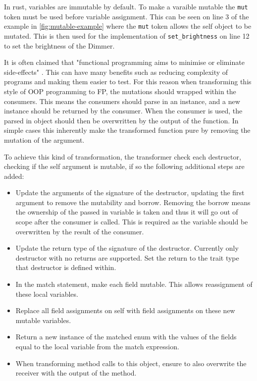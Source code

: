 \documentclass[ oneside,%
                    author={James Elgar},
                    degree={MEng},
                     title={Bidirectional transformer between functional and \\ object-oriented programming in Rust},
                  subtitle={}]{dissertation}
\newcommand{\rust}[1]{\texttt{#1}}
\begin{document}
In rust, variables are immutable by default. To make a varaible mutable the \rust{mut} token must be used before variable assignment. This can be seen on line 3 of the example in \autoref{fig:mutable-example} where the \verb|mut| token allows the self object to be mutated. This is then used for the implementation of \rust{set_brightness} on line 12 to set the brightness of the Dimmer. 

It is often claimed that "functional programming aims to minimise or eliminate side-effects" \cite{fp-uok}. This can have many benefits such as reducing complexity of programs and making them easier to test. For this reason when transforming this style of OOP programming to FP, the mutations should wrapped within the consumers. This means the consumers should parse in an instance, and a new instance should be returned by the consumer. When the consumer is used, the parsed in object should then be overwritten by the output of the function.  In simple cases this inherently make the transformed function pure by removing the mutation of the argument.

To achieve this kind of transformation, the transformer check each destructor, checking if the self argument is mutable, if so the following additional steps are added:

\begin{itemize}
    \item Update the arguments of the signature of the destructor, updating the first argument to remove the mutability and borrow. Removing the borrow means the ownership of the passed in variable is taken and thus it will go out of scope after the consumer is called. This is required  as the variable should be overwritten by the result of the consumer. 
    \item Update the return type of the signature of the destructor. Currently only destructor with no returns are supported. Set the return to the trait type that destructor is defined within.
    \item In the match statement, make each field mutable. This allows reassignment of these local variables.
    \item Replace all field assignments on self with field assignments on these new mutable variables. 
    \item Return a new instance of the matched enum with the values of the fields equal to the local variable from the match expression. 
    \item When transforming method calls to this object, ensure to also overwrite the receiver with the output of the method.
\end{itemize}
\end{document}

